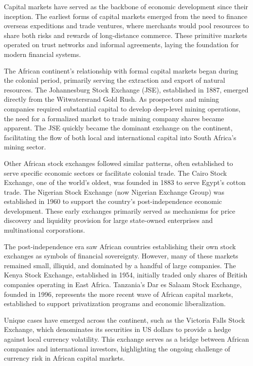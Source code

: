 \documentclass[12pt]{article}
\begin{document}
Capital markets have served as the backbone of economic development since their inception. The earliest forms of capital markets emerged from the need to finance overseas expeditions and trade ventures, where merchants would pool resources to share both risks and rewards of long-distance commerce. These primitive markets operated on trust networks and informal agreements, laying the foundation for modern financial systems.

The African continent's relationship with formal capital markets began during the colonial period, primarily serving the extraction and export of natural resources. The Johannesburg Stock Exchange (JSE), established in 1887, emerged directly from the Witwatersrand Gold Rush. As prospectors and mining companies required substantial capital to develop deep-level mining operations, the need for a formalized market to trade mining company shares became apparent. The JSE quickly became the dominant exchange on the continent, facilitating the flow of both local and international capital into South Africa's mining sector.

Other African stock exchanges followed similar patterns, often established to serve specific economic sectors or facilitate colonial trade. The Cairo Stock Exchange, one of the world's oldest, was founded in 1883 to serve Egypt's cotton trade. The Nigerian Stock Exchange (now Nigerian Exchange Group) was established in 1960 to support the country's post-independence economic development. These early exchanges primarily served as mechanisms for price discovery and liquidity provision for large state-owned enterprises and multinational corporations.

The post-independence era saw African countries establishing their own stock exchanges as symbols of financial sovereignty. However, many of these markets remained small, illiquid, and dominated by a handful of large companies. The Kenya Stock Exchange, established in 1954, initially traded only shares of British companies operating in East Africa. Tanzania's Dar es Salaam Stock Exchange, founded in 1996, represents the more recent wave of African capital markets, established to support privatization programs and economic liberalization.

Unique cases have emerged across the continent, such as the Victoria Falls Stock Exchange, which denominates its securities in US dollars to provide a hedge against local currency volatility. This exchange serves as a bridge between African companies and international investors, highlighting the ongoing challenge of currency risk in African capital markets.
\end{document}
